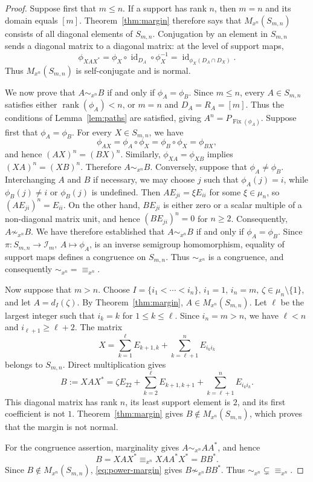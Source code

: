 \documentclass[11pt,a4paper,reqno]{amsart}
\newcommand{\Sn}{S_{m,n}}
\newcommand{\Mn}{M_{x^n}}
\newcommand{\id}{\operatorname{id}}
\numberwithin{equation}{section}
\begin{document}
\begin{proof}
Suppose first that $m\le n$. If a support has rank $n$, then $m=n$ and its domain equals $[m]$. Theorem~\ref{thm:margin} therefore says that $\Mn(\Sn)$ consists of all diagonal elements of $\Sn$. Conjugation by an element in $\Sn$ sends a diagonal matrix to a diagonal matrix: at the level of support maps,
\[
\phi_{XAX^*}=\phi_X\circ\id_{D_A}\circ\phi_X^{-1}
=\id_{\phi_X(D_A\cap D_X)}.
\]
Thus $\Mn(\Sn)$ is self-conjugate and is normal.

We now prove that $A\sim_{x^n}B$ if and only if $\phi_A=\phi_B$. Since $m\le n$, every $A\in\Sn$ satisfies either $\operatorname{rank}(\phi_A)<n$, or $m=n$ and $D_A=R_A=[m]$. Thus the conditions of Lemma~\ref{lem:paths} are satisfied, giving $A^n=P_{\operatorname{Fix}(\phi_A)}$. Suppose first that $\phi_A=\phi_B$. For every $X\in\Sn$, we have
\[
\phi_{AX}=\phi_A\circ\phi_X=\phi_B\circ\phi_X=\phi_{BX},
\]
and hence $(AX)^n=(BX)^n$. Similarly, $\phi_{XA}=\phi_{XB}$ implies $(XA)^n=(XB)^n$. Therefore $A\sim_{x^n}B$. Conversely, suppose that $\phi_A\ne\phi_B$. Interchanging $A$ and $B$ if necessary, we may choose $j$ such that $\phi_A(j)=i$, while $\phi_B(j)\ne i$ or $\phi_B(j)$ is undefined. Then $AE_{ji}=\xi E_{ii}$ for some $\xi\in\mu_n$, so $(AE_{ji})^n=E_{ii}$. On the other hand, $BE_{ji}$ is either zero or a scalar multiple of a non-diagonal matrix unit, and hence $(BE_{ji})^n=0$ for $n\ge2$. Consequently, $A\not\sim_{x^n}B$. We have therefore established that $A\sim_{x^n}B$ if and only if $\phi_A=\phi_B$. Since $\pi:\Sn\to\mathcal I_m,\ A\mapsto\phi_A$, is an inverse semigroup homomorphism, equality of support maps defines a congruence on $\Sn$. Thus $\sim_{x^n}$ is a congruence, and consequently $\sim_{x^n}=\equiv_{x^n}$.

Now suppose that $m>n$. Choose $I=\{i_1<\cdots<i_n\},\,i_1=1,\,i_n=m,\,\zeta\in\mu_n\setminus\{1\}$, and let $A=d_I(\zeta)$. By Theorem~\ref{thm:margin}, $A\in\Mn(\Sn)$. Let $\ell$ be the largest integer such that $i_k=k$ for $1\le k\le\ell$. Since $i_n=m>n$, we have $\ell<n$ and $i_{\ell+1}\ge\ell+2$. The matrix
\begin{equation}\label{eq:conjugator}
X=\sum_{k=1}^{\ell}E_{k+1,k}+\sum_{k=\ell+1}^{n}E_{i_ki_k}
\end{equation}
belongs to $\Sn$. Direct multiplication gives
\begin{equation*}
B:=XAX^*=\zeta E_{22}+\sum_{k=2}^{\ell}E_{k+1,k+1}
+\sum_{k=\ell+1}^{n}E_{i_ki_k}.
\end{equation*}
This diagonal matrix has rank $n$, its least support element is $2$, and its first coefficient is not $1$. Theorem~\ref{thm:margin} gives $B\notin\Mn(\Sn)$, which proves that the margin is not normal.

For the congruence assertion, marginality gives $A\sim_{x^n}AA^*$, and hence
\[
B=XAX^*\equiv_{x^n}XAA^*X^*=BB^*.
\]
Since $B\notin\Mn(\Sn)$, \eqref{eq:power-margin} gives $B\not\sim_{x^n}BB^*$. Thus $\sim_{x^n}\subsetneq\equiv_{x^n}$.
\end{proof}
\end{document}
